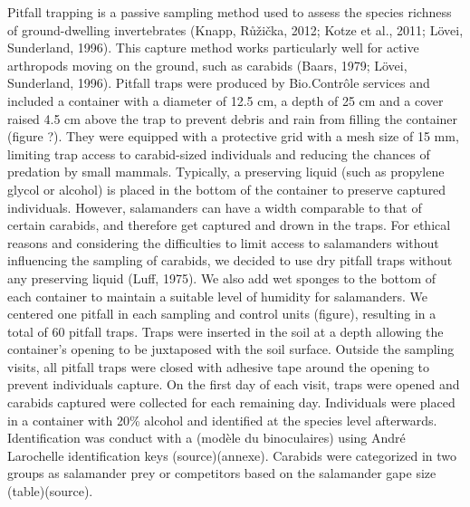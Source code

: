 Pitfall trapping is a passive sampling method used to assess the species richness of ground-dwelling invertebrates (Knapp, Růžička, 2012; Kotze et al., 2011; Lövei,  Sunderland, 1996). 
This capture method works particularly well for active arthropods moving on the ground, such as carabids (Baars, 1979; Lövei, Sunderland, 1996). 
Pitfall traps were produced by Bio.Contrôle services and included a container with a diameter of 12.5 cm, a depth of 25 cm and a cover raised 4.5 cm above the trap 
to prevent debris and rain from filling the container (figure ?).
They were equipped with a protective grid with a mesh size of 15 mm, limiting trap access to carabid-sized individuals and reducing the chances of predation by small mammals. 
Typically, a preserving liquid (such as propylene glycol or alcohol) is placed in the bottom of the container to preserve captured individuals. 
However, salamanders can have a width comparable to that of certain carabids, and therefore get captured and drown in the traps. 
For ethical reasons and considering the difficulties to limit access to salamanders without influencing the sampling of carabids, we decided to use dry pitfall traps without any preserving liquid (Luff, 1975). 
We also add wet sponges to the bottom of each container to maintain a suitable level of humidity for salamanders.
We centered one pitfall in each sampling and control units (figure), resulting in a total of 60 pitfall traps. 
Traps were inserted in the soil at a depth allowing the container's opening to be juxtaposed with the soil surface. 
Outside the sampling visits, all pitfall traps were closed with adhesive tape around the opening to prevent individuals capture. 
On the first day of each visit, traps were opened and carabids captured were collected for each remaining day. 
Individuals were placed in a container with 20\% alcohol and identified at the species level afterwards.
Identification was conduct with a (modèle du binoculaires) using André Larochelle identification keys (source)(annexe).
Carabids were categorized in two groups as salamander prey or competitors based on the salamander gape size (table)(source).

